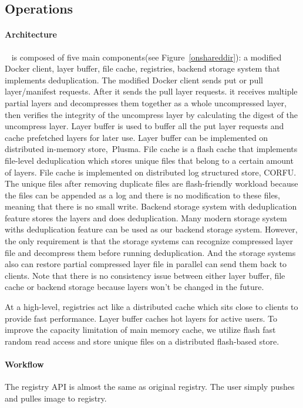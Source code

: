 \subsection{Operations}

\paragraph{Architecture}

\sysname~ is composed of five main components(see Figure~\ref{onshareddir}):
a modified Docker client,
layer buffer,
file cache,
registries,
backend storage system that implements deduplication.
The modified Docker client sends put or pull layer/manifest requests.
After it sends the pull layer requests.
it receives multiple partial layers and decompresses them together as a whole uncompressed layer, then verifies the
integrity of the uncompress layer by calculating the digest of the uncompress layer.
Layer buffer is used to buffer all the put layer requests and 
cache prefetched layers for later use.
Layer buffer can be implemented on distributed in-memory store,~\eg Plusma.
File cache is a flash cache that implements file-level deduplication which stores unique files that belong to a certain amount of layers.
File cache is implemented on distributed log structured store, \eg CORFU.
The unique files after removing duplicate files are flash-friendly workload because
the files can be appended as a log and there is no modification to these files, meaning that there is
no small write.
Backend storage system with deduplication feature stores the layers and does deduplication.
Many modern storage system withs deduplication feature can be used as our backend storage system.
However, the only requirement is that the storage systems can recognize compressed layer file and decompress them before running deduplication.
And the storage systems also can restore partial compressed layer file in parallel can send them back to clients. 
Note that there is no consistency issue between either layer buffer, file cache or backend storage because layers won't be changed in the future.

At a high-level, registries act like a distributed cache which sits close to clients to provide fast performance. 
Layer buffer caches hot layers for active users.
To improve the capacity limitation of main memory cache, we 
utilize flash fast random read access and store unique files on a distributed flash-based store.  

\paragraph{Workflow}
%
The registry API is almost the same as original registry.
The user simply pushes and pulles image to registry. 

